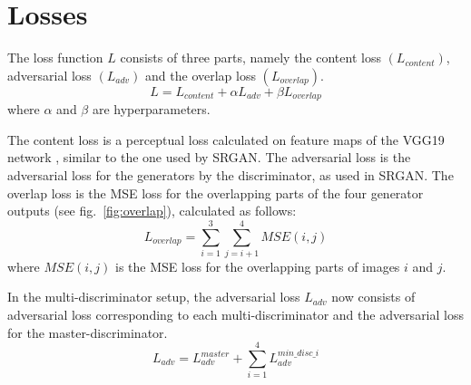 \documentclass[12pt,a4paper,twocolumn]{article}
\begin{document}
    \section{Losses}
        The loss function $L$ consists of three parts, namely the content loss $(L_{content})$, adversarial loss $(L_{adv})$ and the overlap loss $(L_{overlap})$.\\
            $$L = L_{content} + \alpha L_{adv} + \beta L_{overlap}$$
        where $\alpha$ and $\beta$ are hyperparameters.

        The content loss is a perceptual loss \cite{perceptual} calculated on feature maps of the VGG19 network \cite{vgg}, similar to the one used by SRGAN.
        The adversarial loss is the adversarial loss for the generators by the discriminator, as used in SRGAN.
        The overlap loss is the MSE loss for the overlapping parts of the four generator outputs (see fig.~\ref{fig:overlap}), calculated as follows:
            $$L_{overlap} = \sum_{i=1}^3 \sum_{j=i+1}^4 MSE(i, j)$$
        where $MSE(i, j)$ is the MSE loss for the overlapping parts of images $i$ and $j$.

        In the multi-discriminator setup, the adversarial loss $L_{adv}$ now  consists of adversarial loss corresponding to each multi-discriminator and the adversarial loss for the master-discriminator.
            $$L_{adv} = L_{adv}^{master} + \sum_{i=1}^{4}L_{adv}^{min\_disc\_i}$$
\end{document}
